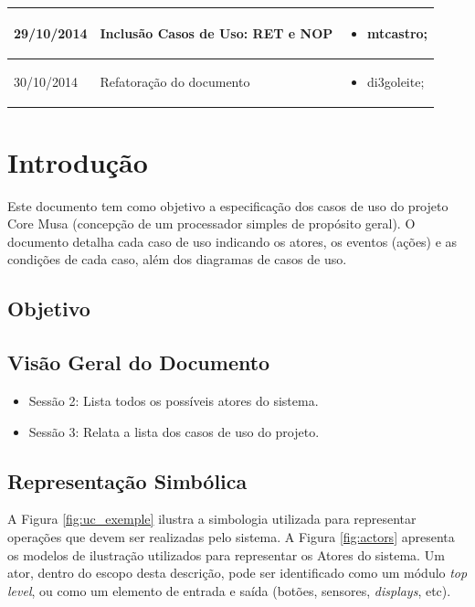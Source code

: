 \documentclass{article}
\begin{document}
\begin{table}[ht]
\begin{tabular}[pos]{|m{2cm} | m{7.2cm} | m{3.8cm}|}
	  \small 29/10/2014 & \small Inclusão Casos de Uso: RET e NOP & \small 
      \begin{itemize}
      	\item mtcastro; 
	  \end{itemize}  
	  \\ \hline
	  
	  \small 30/10/2014 & \small Refatoração do documento & \small 
	  \begin{itemize}
	  	\item di3goleite; 
	  \end{itemize}  
	  \\ \hline
	  
    \end{tabular}
  \end{table}

\newpage

\tableofcontents
\newpage

\section{Introdução}
Este documento tem como objetivo a especificação dos casos de uso do projeto Core Musa (concepção de um processador simples de propósito geral). O documento detalha cada caso de uso indicando os atores, os eventos (ações) e as condições de cada caso, além dos diagramas de casos de uso.

  \subsection{Objetivo}
  
  \subsection{Visão Geral do Documento}
  \begin{itemize}
    \item Sessão 2: Lista todos os possíveis atores do sistema.
    \item Sessão 3: Relata a lista dos casos de uso do projeto.
  \end{itemize}
  
  \subsection{Representação Simbólica}
  A Figura \ref{fig:uc_exemple} ilustra a simbologia utilizada para representar operações que devem ser realizadas pelo sistema. A Figura \ref{fig:actors} apresenta os modelos de ilustração utilizados para representar os Atores do sistema. Um ator, dentro do escopo desta descrição, pode ser identificado como um módulo \textit{top level}, ou como um elemento de entrada e saída (botões, sensores, \textit{displays}, etc).
  
\end{document}
